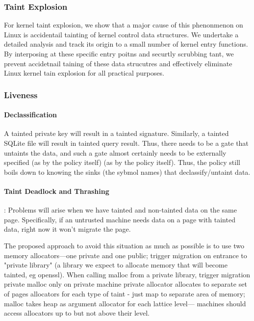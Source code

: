 \subsubsection{Taint Explosion}
For kernel taint explosion, we show that a major cause of this phenonmenon on
Linux is accidentail tainting of kernel control data structures.  We undertake
a detailed analysis and track its origin to a small number of kernel entry
functions.  By interposing at these specific entry poitns and securtly
scrubbing tant, we prevent accidetnail taining of these data strucutres and
effectively eliminate Linux kernel tain explosion for all practical purposes.

\subsubsection{Liveness}
\paragraph{Declassification}
%
A tainted private key will result in a tainted signature.
%
Similarly, a tainted SQLite file will result in tainted query result.
%
Thus, there needs to be a gate that untaints the data, and such a gate almost
certainly needs to be externally specified (as by the policy itself) (as by the
policy itself).  
% 
Thus, the policy still boils down to knowing the sinks (the sybmol names) that
declassify/untaint data.


\paragraph{Taint Deadlock and Thrashing}:
%
Problems will arise when we have tainted and non-tainted data on the same page.
%
Specifically, if an untrusted machine needs data on a page with tainted data,
right now it won't migrate the page.  
%

The proposed approach to avoid this situation as much as possible is to use two
memory allocators---one private and one public; trigger migration on entrance
to "private library" (a library we expect to allocate memory that will become
tainted, eg openssl).  
% 
When calling malloc from a private library, trigger migration private malloc
only on private machine private allocator allocates to separate set of pages
allocators for each type of taint - just map to separate area of memory; malloc
takes heap as argument allocator for each lattice level--- machines should
access allocators up to but not above their level.


